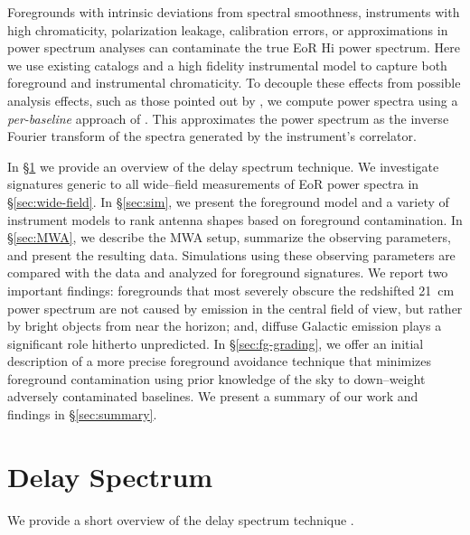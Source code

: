 \documentclass[preprint2,iop,numberedappendix,twocolappendix,appendixfloats]{emulateapj}
\begin{document}
Foregrounds with intrinsic deviations from spectral smoothness, instruments with high chromaticity, polarization leakage, calibration errors, or approximations in power spectrum analyses can contaminate the true EoR H{\sc i} power spectrum. Here we use existing catalogs and a high fidelity instrumental model to capture both foreground and instrumental chromaticity. To decouple these effects from possible analysis effects, such as those pointed out by \citet{haz13}, we compute power spectra using a {\it per-baseline} approach of \citet{par12b}. This approximates the power spectrum as the inverse Fourier transform of the spectra generated by the instrument's correlator. 

In \S\ref{sec:delay-spectrum} we provide an overview of the delay spectrum technique. We investigate signatures generic to all wide--field measurements of EoR power spectra in \S\ref{sec:wide-field}. In \S\ref{sec:sim}, we present the foreground model and a variety of instrument models to rank antenna shapes based on foreground contamination. In \S\ref{sec:MWA}, we describe the MWA setup, summarize the observing parameters, and present the resulting data. Simulations using these observing parameters are compared with the data and analyzed for foreground signatures. We report two important findings: foregrounds that most severely obscure the redshifted 21~cm power spectrum are not caused by emission in the central field of view, but rather by bright objects from near the horizon; and, diffuse Galactic emission plays a significant role hitherto unpredicted. In \S\ref{sec:fg-grading}, we offer an initial description of a more precise foreground avoidance technique that minimizes foreground contamination using prior knowledge of the sky to down--weight adversely contaminated baselines. We present a summary of our work and findings in \S\ref{sec:summary}.

\section{Delay Spectrum}\label{sec:delay-spectrum}

We provide a short overview of the delay spectrum technique \citep{par12a,par12b}. 
\end{document}
